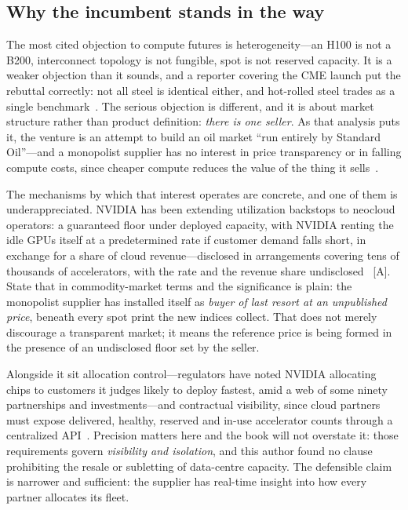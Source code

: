 \subsection{Why the incumbent stands in the way}

The most cited objection to compute futures is heterogeneity---an H100 is not a B200, interconnect topology is not fungible, spot is not reserved capacity. It is a weaker objection than it sounds, and a reporter covering the CME launch put the rebuttal correctly: not all steel is identical either, and hot-rolled steel trades as a single benchmark~\cite{compute-commodity}. The serious objection is different, and it is about market structure rather than product definition: \emph{there is one seller}. As that analysis puts it, the venture is an attempt to build an oil market ``run entirely by Standard Oil''---and a monopolist supplier has no interest in price transparency or in falling compute costs, since cheaper compute reduces the value of the thing it sells~\cite{compute-commodity}.

The mechanisms by which that interest operates are concrete, and one of them is underappreciated. NVIDIA has been extending utilization backstops to neocloud operators: a guaranteed floor under deployed capacity, with NVIDIA renting the idle GPUs itself at a predetermined rate if customer demand falls short, in exchange for a share of cloud revenue---disclosed in arrangements covering tens of thousands of accelerators, with the rate and the revenue share undisclosed~\cite{nvidia-backstop-floor} [A]. State that in commodity-market terms and the significance is plain: the monopolist supplier has installed itself as \emph{buyer of last resort at an unpublished price}, beneath every spot print the new indices collect. That does not merely discourage a transparent market; it means the reference price is being formed in the presence of an undisclosed floor set by the seller.

Alongside it sit allocation control---regulators have noted NVIDIA allocating chips to customers it judges likely to deploy fastest, amid a web of some ninety partnerships and investments---and contractual visibility, since cloud partners must expose delivered, healthy, reserved and in-use accelerator counts through a centralized API~\cite{nvidia-allocation,nvidia-ncp}. Precision matters here and the book will not overstate it: those requirements govern \emph{visibility and isolation}, and this author found no clause prohibiting the resale or subletting of data-centre capacity. The defensible claim is narrower and sufficient: the supplier has real-time insight into how every partner allocates its fleet.

